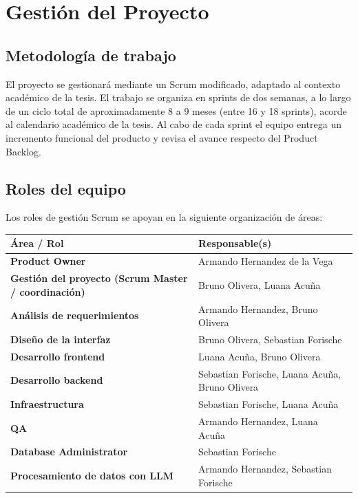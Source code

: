 \documentclass[11pt,a4paper]{article}
\begin{document}
\section{Gesti\'on del Proyecto}

\subsection{Metodolog\'ia de trabajo}

El proyecto se gestionar\'a mediante un Scrum modificado, adaptado al contexto acad\'emico de la tesis. El trabajo se organiza en sprints de dos semanas, a lo largo de un ciclo total de aproximadamente 8 a 9 meses (entre 16 y 18 sprints), acorde al calendario acad\'emico de la tesis. Al cabo de cada sprint el equipo entrega un incremento funcional del producto y revisa el avance respecto del Product Backlog.

\subsection{Roles del equipo}

Los roles de gesti\'on Scrum se apoyan en la siguiente organizaci\'on de \'areas:

\begin{tabularx}{\textwidth}{@{} >{\bfseries}p{5.4cm} X @{}}
\toprule
\textbf{\'Area / Rol} & \textbf{Responsable(s)} \\
\midrule
Product Owner & Armando Hernandez de la Vega \\
Gesti\'on del proyecto (Scrum Master / coordinaci\'on) & Bruno Olivera, Luana Acu\~na \\
An\'alisis de requerimientos & Armando Hernandez, Bruno Olivera \\
Dise\~no de la interfaz & Bruno Olivera, Sebastian Forische \\
Desarrollo frontend & Luana Acu\~na, Bruno Olivera \\
Desarrollo backend & Sebastian Forische, Luana Acu\~na, Bruno Olivera \\
Infraestructura & Sebastian Forische, Luana Acu\~na \\
QA & Armando Hernandez, Luana Acu\~na \\
Database Administrator & Sebastian Forische \\
Procesamiento de datos con LLM & Armando Hernandez, Sebastian Forische \\
\bottomrule
\end{tabularx}
\bigskip
\end{document}
